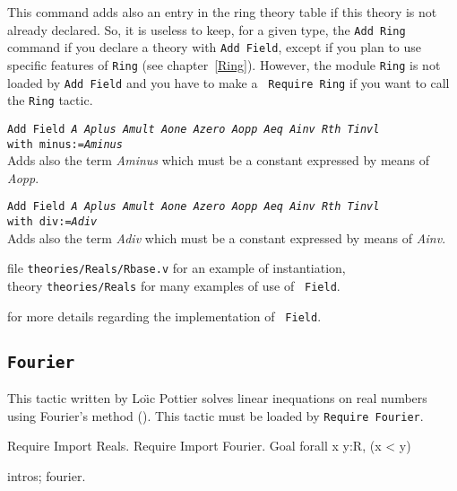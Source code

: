 This command adds also an entry in the ring theory table if this theory is not
already declared. So, it is useless to keep, for a given type, the {\tt Add
Ring} command if you declare a theory with {\tt Add Field}, except if you plan
to use specific features of {\tt Ring} (see chapter~\ref{Ring}). However, the
module {\tt Ring} is not loaded by {\tt Add Field} and you have to make a {\tt
Require Ring} if you want to call the {\tt Ring} tactic.

\begin{Variants}
\item {\tt Add Field {\it A} {\it Aplus} {\it Amult} {\it Aone} {\it Azero}
{\it Aopp} {\it Aeq} {\it Ainv} {\it Rth} {\it Tinvl}}\\
{\tt \phantom{Add Field }with minus:={\it Aminus}}\\
Adds also the term {\it Aminus} which must be a constant expressed by means of
{\it Aopp}.

\item {\tt Add Field {\it A} {\it Aplus} {\it Amult} {\it Aone} {\it Azero}
{\it Aopp} {\it Aeq} {\it Ainv} {\it Rth} {\it Tinvl}}\\
{\tt \phantom{Add Field }with div:={\it Adiv}}\\
Adds also the term {\it Adiv} which must be a constant expressed by means of
{\it Ainv}.
\end{Variants}

\SeeAlso file {\tt theories/Reals/Rbase.v} for an example of instantiation,\\
\phantom{\SeeAlso}theory {\tt theories/Reals} for many examples of use of {\tt
Field}.

\SeeAlso \cite{DelMay01} for more details regarding the implementation of {\tt
Field}.

\subsection{\tt Fourier}

This tactic written by Lo{\"\i}c Pottier solves linear inequations on real numbers 
using Fourier's method (\cite{Fourier}). This tactic must be loaded by 
{\tt Require Fourier}.

\Example
\begin{coq_example*}
Require Import Reals.
Require Import Fourier.
Goal   forall x y:R, (x < y)%
\end{coq_example*}

\begin{coq_example}
intros; fourier.
\end{coq_example}

